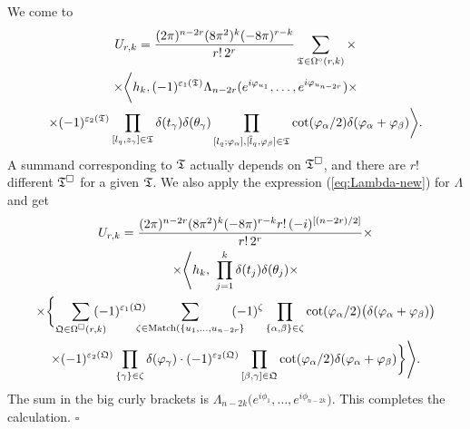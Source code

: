 \documentclass{article}
\def\sm{\smallskip}
\begin{document}
\sm

We come to
\begin{multline*}
U_{r,k}=
\frac {(2\pi)^{n-2r} (8\pi^2)^k (-8\pi)^{r-k} } {r!\,2^r}  
\sum_{\mathfrak T\in \Omega^\circ(r,k)}
\times\\\times
\biggl\langle h_k,
 (-1)^{\varepsilon_1(\mathfrak T)}
\Lambda_{n-2r}(e^{i\varphi_{u_1}},\dots, e^{i\varphi_{u_{n-2r}}})
\times \\ \times
(-1)^{\varepsilon_2(\mathfrak T)}
\prod_{[l_q,z_\gamma]\in \mathfrak T}
\delta(t_\gamma) \delta(\theta_\gamma)
\prod_{[l_q;\varphi_\alpha], [\overline l_q,\varphi_\beta]\in\mathfrak T}
\cot(\varphi_\alpha/2)\delta(\varphi_\alpha+\varphi_\beta)
\biggr\rangle
.
\end{multline*}
A summand corresponding to $\mathfrak T$ actually depends  on $\mathfrak T^\square$,
and there are $r!$ different $\mathfrak T^\square$ for a given $\mathfrak T$.
We also apply the expression (\ref{eq:Lambda-new})
for $\Lambda$ and get
\begin{multline*}
U_{r,k}=
\frac { (2\pi)^{n-2r} (8\pi^2)^k (-8\pi)^{r-k} r!\, (-i)^{[(n-2r)/2]} } {r!\,2^r}  \times
\\ \times
\Biggl\la h_k,\,\,
\prod_{j=1}^k \delta(t_j) \delta(\theta_j) 
\times\\\times
\biggl\{\sum_{\frQ\in \Omega^\square(r,k)}\!\!\!\!\!\!
(-1)^{\epsilon_1(\frQ)} \!\!\!\!\!\!
\sum_{\zeta\in \Match(\{u_1,\dots, u_{n-2r}\}} \!\!\!\!\!\!
(-1)^\zeta \prod_{\{\alpha,\beta\}\in \zeta} \cot (\phi_\alpha/2)
\bigl(\delta(\phi_\alpha+\phi_\beta)\bigr)
\\
\times (-1)^{\epsilon_2(\frQ)}
\prod_{\{\gamma\}\in \zeta} \delta(\phi_\gamma)\cdot
 (-1)^{\epsilon_2(\frQ)}
\prod_{[\beta,\gamma]\in\frQ}
\cot(\phi_\alpha/2)\delta(\phi_\alpha+\phi_\beta)
\biggr\}\Biggr\ra.
\end{multline*}
The sum in the big curly brackets is $\Lambda_{n-2k}\bigl(e^{i\phi_1},\dots, e^{i\phi_{n-2k}}\bigr)$.
This completes the calculation.
\hfill $\square$
\end{document}
